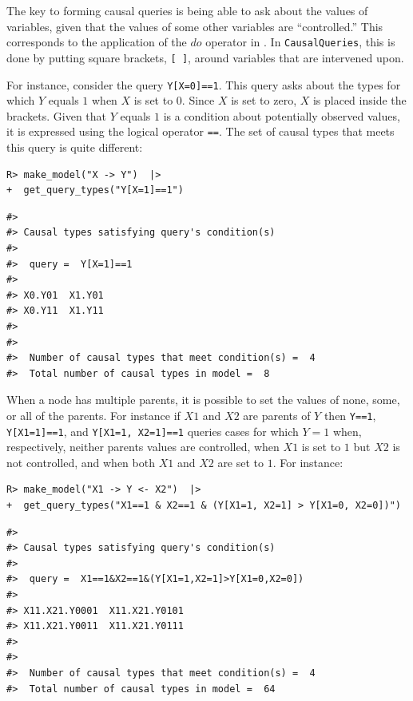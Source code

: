 \documentclass[
  11pt,
  article]{jss}
\begin{document}
The key to forming causal queries is being able to ask about the values
of variables, given that the values of some other variables are
``controlled.'' This corresponds to the application of the \(do\)
operator in \citet{pearl_causality_2009}. In \texttt{CausalQueries},
this is done by putting square brackets, \texttt{{[}\ {]}}, around
variables that are intervened upon.

For instance, consider the query \texttt{Y{[}X=0{]}==1}. This query asks
about the types for which \(Y\) equals \(1\) when \(X\) is set to \(0\).
Since \(X\) is set to zero, \(X\) is placed inside the brackets. Given
that \(Y\) equals \(1\) is a condition about potentially observed
values, it is expressed using the logical operator \texttt{==}. The set
of causal types that meets this query is quite different:

\begin{verbatim}
R> make_model("X -> Y")  |> 
+  get_query_types("Y[X=1]==1")
\end{verbatim}

\begin{verbatim}
#> 
#> Causal types satisfying query's condition(s)  
#> 
#>  query =  Y[X=1]==1 
#> 
#> X0.Y01  X1.Y01
#> X0.Y11  X1.Y11
#> 
#> 
#>  Number of causal types that meet condition(s) =  4
#>  Total number of causal types in model =  8
\end{verbatim}

When a node has multiple parents, it is possible to set the values of
none, some, or all of the parents. For instance if \(X1\) and \(X2\) are
parents of \(Y\) then \texttt{Y==1}, \texttt{Y{[}X1=1{]}==1}, and
\texttt{Y{[}X1=1,\ X2=1{]}==1} queries cases for which \(Y=1\) when,
respectively, neither parents values are controlled, when \(X1\) is set
to \(1\) but \(X2\) is not controlled, and when both \(X1\) and \(X2\)
are set to \(1\). For instance:

\begin{verbatim}
R> make_model("X1 -> Y <- X2")  |>
+  get_query_types("X1==1 & X2==1 & (Y[X1=1, X2=1] > Y[X1=0, X2=0])")
\end{verbatim}

\begin{verbatim}
#> 
#> Causal types satisfying query's condition(s)  
#> 
#>  query =  X1==1&X2==1&(Y[X1=1,X2=1]>Y[X1=0,X2=0]) 
#> 
#> X11.X21.Y0001  X11.X21.Y0101
#> X11.X21.Y0011  X11.X21.Y0111
#> 
#> 
#>  Number of causal types that meet condition(s) =  4
#>  Total number of causal types in model =  64
\end{verbatim}
\end{document}
